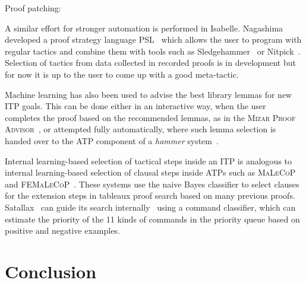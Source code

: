 \documentclass[runningheads,a4paper,draft]{svjour3}
\def\isabelle{\textsf{Isabelle}\xspace}
\def\hollight{\textsf{HOL Light}\xspace}
\def\sledgehammer{\textsf{Sledgehammer}\xspace}
\begin{document}
Proof patching: \cite{RingerYLG18}

A similar effort for stronger automation is performed in \isabelle. Nagashima 
developed a proof strategy language PSL~\cite{NagashimaK17psl} which allows the 
user to 
program with regular tactics and combine them with tools such as 
\sledgehammer~\cite{sledgehammer10} or Nitpick~\cite{Nitpick10}. 
Selection of tactics from data collected in recorded proofs is in development 
but for now it is up to the user to come up with a good meta-tactic.


Machine learning has also been used to advise the best library lemmas for new 
ITP goals.
This can be done either in an interactive way, when the user completes the 
proof based on the recommended lemmas, as in the \textsc{Mizar Proof 
Advisor}~\cite{Urb04-MPTP0}, or attempted fully automatically, where such lemma 
selection is handed over to the ATP component of a \emph{hammer} 
system~\cite{hammers4qed,tgck-cpp15,holyhammer,BlanchetteGKKU16,mizAR40}.

Internal learning-based selection of tactical steps inside an ITP is analogous 
to internal learning-based selection of clausal steps inside ATPs such as 
\textsc{MaLeCoP}~\cite{malecop} and \textsc{FEMaLeCoP}~\cite{femalecop}. These 
systems
use the naive Bayes classifier to  select clauses for the extension steps in
tableaux proof search based on many previous proofs. Satallax~\cite{Brown2012a} 
can guide its
search internally~\cite{mllax} using a command classifier, which can estimate 
the priority of the 11 kinds of
commands in the priority queue based on positive and negative examples.


\section{Conclusion}\label{sec:concl}

\end{document}
